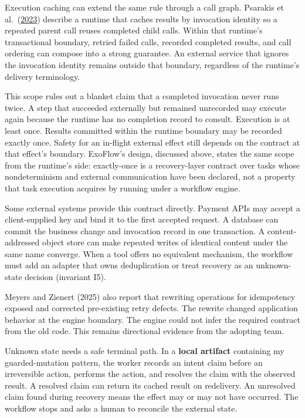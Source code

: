 Execution caching can extend the same rule through a call graph. Psarakis et al.~(\href{https://arxiv.org/abs/2312.06893}{2023}) describe a runtime that caches results by invocation identity so a repeated parent call reuses completed child calls. Within that runtime's transactional boundary, retried failed calls, recorded completed results, and call ordering can compose into a strong guarantee. An external service that ignores the invocation identity remains outside that boundary, regardless of the runtime's delivery terminology.

This scope rules out a blanket claim that a completed invocation never runs twice. A step that succeeded externally but remained unrecorded may execute again because the runtime has no completion record to consult. Execution is at least once. Results committed within the runtime boundary may be recorded exactly once. Safety for an in-flight external effect still depends on the contract at that effect's boundary. ExoFlow's design, discussed above, states the same scope from the runtime's side: exactly-once is a recovery-layer contract over tasks whose nondeterminism and external communication have been declared, not a property that task execution acquires by running under a workflow engine.

Some external systems provide this contract directly. Payment APIs may accept a client-supplied key and bind it to the first accepted request. A database can commit the business change and invocation record in one transaction. A content-addressed object store can make repeated writes of identical content under the same name converge. When a tool offers no equivalent mechanism, the workflow must add an adapter that owns deduplication or treat recovery as an unknown-state decision (invariant I5).

Meyers and Zienert (2025) also report that rewriting operations for idempotency exposed and corrected pre-existing retry defects. The rewrite changed application behavior at the engine boundary. The engine could not infer the required contract from the old code. This remains directional evidence from the adopting team.

Unknown state needs a safe terminal path. In a \textbf{local artifact} containing my guarded-mutation pattern, the worker records an intent claim before an irreversible action, performs the action, and resolves the claim with the observed result. A resolved claim can return its cached result on redelivery. An unresolved claim found during recovery means the effect may or may not have occurred. The workflow stops and asks a human to reconcile the external state.

